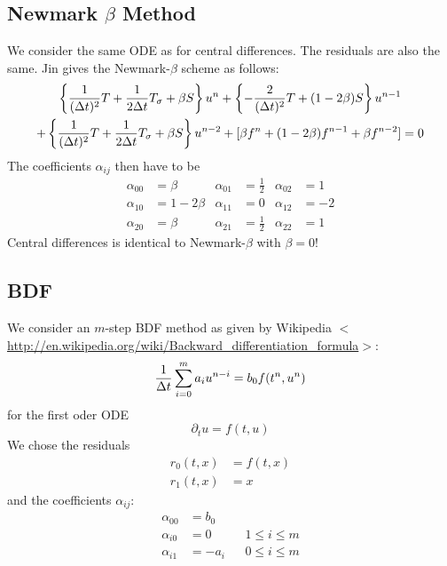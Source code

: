 \documentclass[11pt,a4paper,DIV11,%
notitlepage,oneside,abstracton,%
bibtotoc]{scrartcl}
\begin{document}
\subsection{Newmark $\beta$ Method}

We consider the same ODE as for central differences.  The residuals are also
the same.  Jin gives the Newmark-$\beta$ scheme as follows:
\begin{multline}
  \left\{{1 \over (\Delta t)^2}T + {1 \over 2\Delta t}T_\sigma + \beta S \right\} u^n
  +\left\{-{2 \over (\Delta t)^2}T + (1-2\beta)S \right\} u^{n-1} \\
  +\left\{{1 \over (\Delta t)^2}T + {1 \over 2\Delta t}T_\sigma + \beta S \right\} u^{n-2}
  +[\beta f^n + (1-2\beta)f^{n-1} + \beta f^{n-2}] = 0
\end{multline}
The coefficients $\alpha_{ij}$ then have to be
\begin{align}
  \alpha_{00}&=\beta    & \alpha_{01}&=\frac12 & \alpha_{02}&=1 \\
  \alpha_{10}&=1-2\beta & \alpha_{11}&=0       & \alpha_{12}&=-2 \\
  \alpha_{20}&=\beta    & \alpha_{21}&=\frac12 & \alpha_{22}&=1
\end{align}
Central differences is identical to Newmark-$\beta$ with $\beta=0$!

\subsection{BDF}

We consider an $m$-step BDF method as given by Wikipedia
$<$\url{http://en.wikipedia.org/wiki/Backward_differentiation_formula}$>$:
\begin{equation}
  {1 \over \Delta t} \sum_{i=0}^m a_i u^{n-i} = b_0 f(t^n,u^n)
\end{equation}
for the first oder ODE
\begin{equation}
  \partial_tu = f(t,u)
\end{equation}
We chose the residuals
\begin{align}
  r_0(t,x)&=f(t,x) \\
  r_1(t,x)&=x
\end{align}
and the coefficients $\alpha_{ij}$:
\begin{equation}\begin{aligned}
  \alpha_{00}&=b_0 \\
  \alpha_{i0}&=0    && 1 \leq i \leq m \\
  \alpha_{i1}&=-a_i && 0 \leq i \leq m
\end{aligned}\end{equation}
\end{document}
